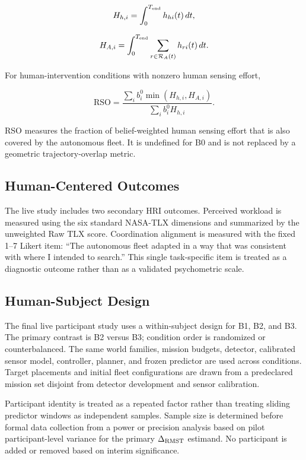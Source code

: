 \documentclass[conference]{IEEEtran}
\begin{document}
\begin{equation}
H_{h,i}=\int_0^{T_{\rm end}} h_{hi}(t)\,dt,
\label{eq:human_hazard_effort}
\end{equation}

\begin{equation}
H_{A,i}=\int_0^{T_{\rm end}}
\sum_{r\in\mathcal{R}_A(t)}h_{ri}(t)\,dt.
\label{eq:auto_hazard_effort}
\end{equation}

For human-intervention conditions with nonzero human sensing effort,

\begin{equation}
\mathrm{RSO}=
\frac{\sum_i b_i^0\min(H_{h,i},H_{A,i})}
{\sum_i b_i^0 H_{h,i}}.
\label{eq:rso}
\end{equation}

RSO measures the fraction of belief-weighted human sensing effort that is also
covered by the autonomous fleet. It is undefined for B0 and is not replaced by
a geometric trajectory-overlap metric.

\subsection{Human-Centered Outcomes}

The live study includes two secondary HRI outcomes. Perceived workload is
measured using the six standard NASA-TLX dimensions and summarized by the
unweighted Raw TLX score. Coordination alignment is measured with the fixed
1--7 Likert item: ``The autonomous fleet adapted in a way that was consistent
with where I intended to search.'' This single task-specific item is treated as
a diagnostic outcome rather than as a validated psychometric scale.

\subsection{Human-Subject Design}

The final live participant study uses a within-subject design for B1, B2, and
B3. The primary contrast is B2 versus B3; condition order is randomized or
counterbalanced. The same world families, mission budgets, detector, calibrated
sensor model, controller, planner, and frozen predictor are used across
conditions. Target placements and initial fleet configurations are drawn from
a predeclared mission set disjoint from detector development and sensor
calibration.

Participant identity is treated as a repeated factor rather than treating
sliding predictor windows as independent samples. Sample size is determined
before formal data collection from a power or precision analysis based on
pilot participant-level variance for the primary $\Delta_{\rm RMST}$ estimand.
No participant is added or removed based on interim significance.
\end{document}
